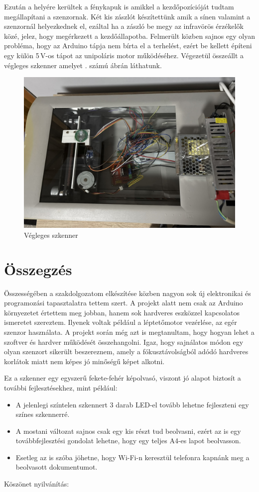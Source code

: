 \documentclass[]{thesis-ekf}
\theoremstyle{definition}
\theoremstyle{remark}
\begin{document}
	Ezután a helyére kerültek a fénykapuk is amikkel a kezdőpozícióját tudtam megállapítani a szenzornak. Két kis zászlót készítettünk amik a sínen valamint a szenzornál helyezkednek el, ezáltal ha a zászló be megy az infravörös érzékelők közé, jelez, hogy megérkezett a kezdőállapotba. Felmerült közben sajnos egy olyan probléma, hogy az Arduino tápja nem bírta el a terhelést, ezért be kellett építeni egy külön 5\,V-os tápot az unipoláris motor működéséhez. Végezetül összeállt a végleges szkenner amelyet . számú ábrán láthatunk.
	\begin{figure}[th!]
		\centering
		\includegraphics[width=0.7\linewidth]{finished_scanner}
		\caption[Végleges szkenner]{Végleges szkenner}
		\label{fig:finishedscanner}
	\end{figure}
	
	\chapter*{Összegzés}
	Összességében a szakdolgozatom elkészítése közben nagyon sok új elektronikai és programozási tapasztalatra tettem szert. A projekt alatt nem csak az Arduino környezetet értettem meg jobban, hanem sok hardveres eszközzel kapcsolatos ismeretet szereztem. Ilyenek voltak például a léptetőmotor vezérlése, az egér szenzor használata. A projekt során még azt is megtanultam, hogy hogyan lehet a szoftver és hardver működését összehangolni. Igaz, hogy sajnálatos módon egy olyan szenzort sikerült beszereznem, amely a fókusztávolságból adódó hardveres korlátok miatt nem képes jó minőségű képet alkotni.
	
	Ez a szkenner egy egyszerű fekete-fehér képolvasó, viszont jó alapot biztosít a további fejlesztésekhez, mint például:
	\begin{itemize}
		\item A jelenlegi színtelen szkennert 3 darab LED-el tovább lehetne fejleszteni egy színes szkennerré.
		\item A mostani változat sajnos csak egy kis részt tud beolvasni, ezért az is egy továbbfejlesztési gondolat lehetne, hogy egy teljes A4-es lapot beolvasson.
		\item Esetleg az is szóba jöhetne, hogy Wi-Fi-n keresztül telefonra kapnánk meg a beolvasott dokumentumot.
	\end{itemize}
	\vspace*{2cm}
	Köszönet nyilvánítás: 
	
\end{document}

